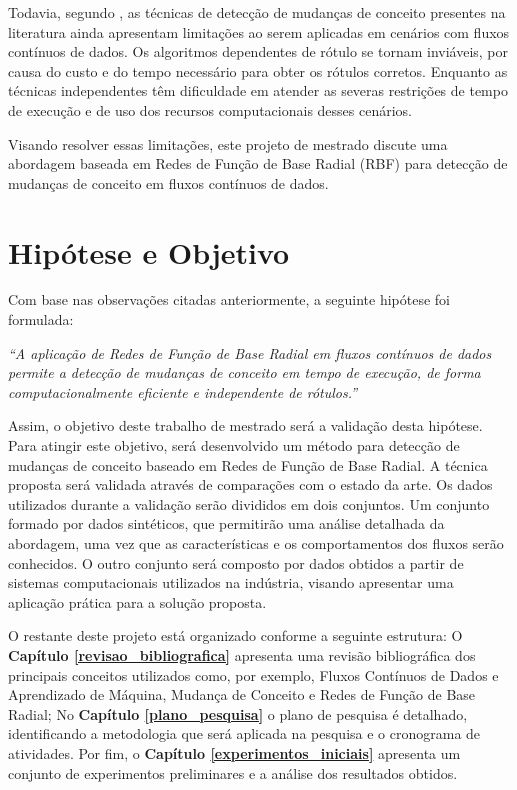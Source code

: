 \documentclass[msc, classic, a4paper]{ufbathesis}
\begin{document}
Todavia, segundo ,
as técnicas de detecção de mudanças de conceito presentes na literatura ainda apresentam limitações ao serem aplicadas em cenários com fluxos contínuos de dados.
%
Os algoritmos dependentes de rótulo se tornam inviáveis, por causa do custo e do tempo necessário para obter os rótulos corretos.
%
Enquanto as técnicas independentes têm dificuldade em atender as severas restrições de tempo de execução e de uso dos recursos computacionais desses cenários.

Visando resolver essas limitações,
este projeto de mestrado discute uma abordagem baseada em Redes de Função de Base Radial (RBF)
para detecção de mudanças de conceito em fluxos contínuos de dados.

\section{Hipótese e Objetivo}

Com base nas observações citadas anteriormente, a seguinte hipótese foi formulada:

\begin{center}
\textit{``A aplicação de Redes de Função de Base Radial em fluxos contínuos de dados permite a detecção de mudanças de conceito em tempo de execução, de forma computacionalmente eficiente e independente de rótulos.''}
\end{center}

Assim, o objetivo deste trabalho de mestrado será a validação desta hipótese.
%
Para atingir este objetivo, será desenvolvido um método para detecção de mudanças de conceito baseado em Redes de Função de Base Radial.
%
A técnica proposta será validada através de comparações com o estado da arte.
%
Os dados utilizados durante a validação serão divididos em dois conjuntos.
%
Um conjunto formado por dados sintéticos, que permitirão uma análise detalhada da abordagem, uma vez que as características e os comportamentos dos fluxos serão conhecidos.
%
O outro conjunto será composto por dados obtidos a partir de sistemas computacionais utilizados na indústria, visando apresentar uma aplicação prática para a solução proposta.

O restante deste projeto está organizado conforme a seguinte estrutura:
%
O \textbf{Capítulo \ref{revisao_bibliografica}} apresenta uma revisão bibliográfica dos principais conceitos utilizados como,
por exemplo, Fluxos Contínuos de Dados e Aprendizado de Máquina, Mudança de Conceito e Redes de Função de Base Radial;
%
No \textbf{Capítulo \ref{plano_pesquisa}} o plano de pesquisa é detalhado, identificando a metodologia que será aplicada na pesquisa e o cronograma de atividades.
%
Por fim, o \textbf{Capítulo \ref{experimentos_iniciais}} apresenta um conjunto de experimentos preliminares e a análise dos resultados obtidos.
\end{document}
